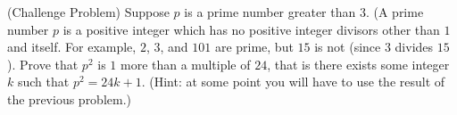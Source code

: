 (Challenge Problem) Suppose $p$ is a prime number greater than $3$. (A prime number $p$ is a positive integer which has no positive integer divisors other than $1$ and itself. For example, $2$, $3$, and $101$ are prime, but $15$ is not (since $3$ divides $15$).
Prove that $p^2$ is $1$ more than a multiple of $24$, that is there exists some integer $k$ such that $p^2 = 24k + 1$.
(Hint: at some point you will have to use the result of the previous problem.)